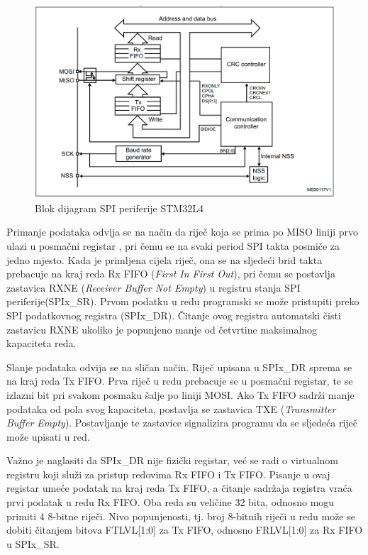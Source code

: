 \begin{figure}[htb]
	\centering
	\includegraphics{slike/STM32L4_SPI_blok_dijagram.png}
	\caption{Blok dijagram SPI periferije STM32L4 \cite[str.~1451]{stm32l4_manual}}
	\label{fig:stm32l4_spi}
\end{figure}

Primanje podataka odvija se na način da riječ koja se prima po MISO liniji prvo ulazi u posmačni registar , pri čemu se na svaki period SPI takta posmiče za jedno mjesto. Kada je primljena cijela riječ, ona se na sljedeći brid takta prebacuje na kraj reda Rx FIFO (\textit{First In First Out}), pri čemu se postavlja zastavica RXNE (\textit{Receiver Buffer Not Empty}) u registru stanja SPI periferije(SPIx\_SR). Prvom podatku u redu programski se može pristupiti preko SPI podatkovnog registra (SPIx\_DR). Čitanje ovog registra automatski čisti zastavicu RXNE ukoliko je popunjeno manje od četvrtine maksimalnog kapaciteta reda.

Slanje podataka odvija se na sličan način. Riječ upisana u SPIx\_DR sprema se na kraj reda Tx FIFO. Prva riječ u redu prebacuje se u posmačni registar, te se izlazni bit pri svakom posmaku šalje po liniji MOSI. Ako Tx FIFO sadrži manje podataka od pola svog kapaciteta, postavlja se zastavica TXE (\textit{Transmitter Buffer Empty}). Postavljanje te zastavice signalizira programu da se sljedeća riječ može upisati u red.

Važno je naglasiti da SPIx\_DR nije fizički registar, već se radi o virtualnom registru koji služi za pristup redovima Rx FIFO i Tx FIFO. Pisanje u ovaj registar umeće podatak na kraj reda Tx FIFO, a čitanje sadržaja registra vraća prvi podatak u redu Rx FIFO. Oba reda su veličine 32 bita, odnosno mogu primiti 4 8-bitne riječi. Nivo popunjenosti, tj. broj 8-bitnih riječi u redu može se dobiti čitanjem bitova FTLVL[1:0] za Tx FIFO, odnosno FRLVL[1:0] za Rx FIFO u SPIx\_SR. 


